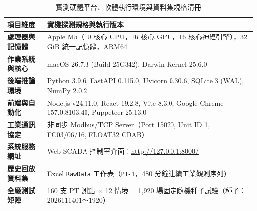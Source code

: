 \documentclass[fontset=none, a4paper, 12pt]{ctexart}
\begin{document}
\begin{doublespace}
\begin{table}[H]
\centering
\caption{實測硬體平台、軟體執行環境與資料集規格清冊}
\label{tab:env_real}
\footnotesize
\renewcommand{\arraystretch}{1.15}
\setlength{\tabcolsep}{5pt}
\begin{tabularx}{0.96\textwidth}{>{\bfseries}lX}
\toprule
項目維度 & 實機探測規格與執行版本 \\
\midrule
處理器與記憶體 & Apple M5（10 核心 CPU，16 核心 GPU，16 核心神經引擎），32 GiB 統一記憶體，ARM64 \\
作業系統與核心 & macOS 26.7.3 (Build 25G342), Darwin Kernel 25.6.0 \\
後端推論環境 & Python 3.9.6, FastAPI 0.115.0, Uvicorn 0.30.6, SQLite 3 (WAL), NumPy 2.0.2 \\
前端與自動化 & Node.js v24.11.0, React 19.2.8, Vite 8.3.0, Google Chrome 157.0.8103.40, Puppeteer 25.13.0 \\
工業通訊協定 & 非同步 Modbus/TCP Server（Port 15020, Unit ID 1, FC03/06/16, FLOAT32 CDAB） \\
系統服務網址 & Web SCADA 控制室介面：\url{http://127.0.0.1:8000/} \\
歷史回放資料集 & Excel \texttt{RawData} 工作表（\texttt{PT-1}，480 分鐘連續工業觀測序列） \\
全廠測試矩陣 & 160 支 PT 測點 $\times$ 12 情境 = 1,920 場固定隨機種子試驗（種子：2026111401～1920） \\
\bottomrule
\end{tabularx}
\end{table}


\end{doublespace}
\end{document}
